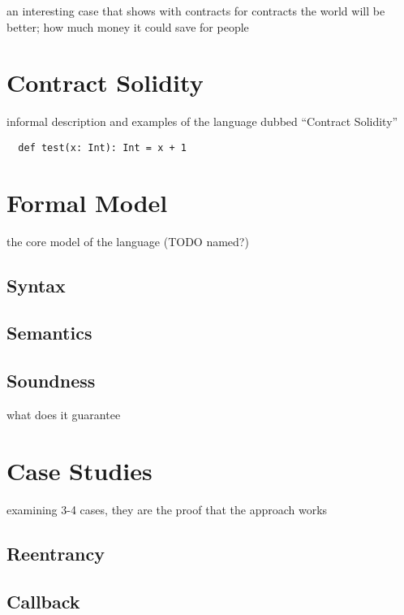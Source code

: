\documentclass[acmsmall,review,anonymous]{acmart}\settopmatter{printfolios=true,printccs=false,printacmref=false}
\begin{document}
an interesting case that shows with contracts for contracts the world will be better;
how much money it could save for people


\section{Contract Solidity}

informal description and examples of the language dubbed ``Contract Solidity''

\begin{lstlisting}
  def test(x: Int): Int = x + 1
\end{lstlisting}

\section{Formal Model}

the core model of the language (TODO named?)

\subsection{Syntax}

\subsection{Semantics}

\subsection{Soundness}

what does it guarantee

\section{Case Studies}

examining 3-4 cases, they are the proof that the approach works

\subsection{Reentrancy}

\subsection{Callback}
\end{document}
